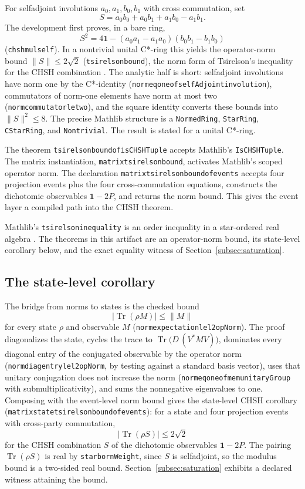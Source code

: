 \documentclass[11pt]{article}
\renewcommand{\_}{\textunderscore\allowbreak}
\theoremstyle{remark}
\newcommand{\Tr}{\operatorname{Tr}}
\newcommand{\one}{\mathbf 1}
\newcommand{\norm}[1]{\lVert #1\rVert}
\begin{document}
For selfadjoint involutions $a_0,a_1,b_0,b_1$ with cross commutation, set
\[
 S=a_0b_0+a_0b_1+a_1b_0-a_1b_1.
\]
The development first proves, in a bare ring,
\[
 S^2=4\one-(a_0a_1-a_1a_0)(b_0b_1-b_1b_0)
\]
(\texttt{chsh\_mul\_self}). In a nontrivial unital C*-ring this yields the
operator-norm bound $\norm{S}\le2\sqrt2$
(\texttt{tsirelson\_bound}), the norm form of Tsirelson's inequality
\cite{tsirelson1980} for the CHSH combination \cite{chsh1969}. The analytic
half is short: selfadjoint involutions have norm one by the C*-identity
(\texttt{norm\_eq\_one\_of\_selfAdjoint\_involution}), commutators of
norm-one elements have norm at most two
(\texttt{norm\_commutator\_le\_two}), and the square identity converts these
bounds into $\norm{S}^2\le8$. The precise Mathlib structure is a
\texttt{NormedRing}, \texttt{StarRing}, \texttt{CStarRing}, and
\texttt{Nontrivial}. The result is stated for a unital C*-ring.

The theorem \texttt{tsirelson\_bound\_of\_isCHSHTuple} accepts Mathlib's
\texttt{IsCHSHTuple}. The matrix instantiation,
\texttt{matrix\_tsirelson\_bound}, activates Mathlib's scoped operator
norm. The declaration \texttt{matrix\_tsirelson\_bound\_of\_events} accepts four
projection events plus the four cross-commutation equations, constructs the
dichotomic observables $\one-2P$, and returns the norm bound. This gives the
event layer a compiled path into the CHSH theorem.

Mathlib's \texttt{tsirelson\_inequality} is an order inequality in a
star-ordered real algebra \cite{mathlibCHSH2026}. The theorems in this
artifact are an operator-norm bound, its state-level corollary below, and
the exact equality witness of Section~\ref{subsec:saturation}.

\subsection{The state-level corollary}
\label{subsec:statechsh}

The bridge from norms to states is the checked bound
\[
 \lvert\Tr(\rho M)\rvert\le\norm{M}
\]
for every state $\rho$ and observable $M$
(\texttt{norm\_expectation\_le\_l2\_opNorm}). The proof diagonalizes the
state, cycles the trace to $\Tr\!\bigl(D\,(V^*MV)\bigr)$, dominates every
diagonal entry of the conjugated observable by the operator norm
(\texttt{norm\_diag\_entry\_le\_l2\_opNorm}, by testing against a standard
basis vector), uses that unitary conjugation does not increase the norm
(\texttt{norm\_eq\_one\_of\_mem\_unitaryGroup} with submultiplicativity), and
sums the nonnegative eigenvalues to one. Composing with the event-level norm
bound gives the state-level CHSH corollary
(\texttt{matrix\_state\_tsirelson\_bound\_of\_events}): for a state and four
projection events with cross-party commutation,
\[
 \bigl\lvert\Tr(\rho S)\bigr\rvert\le2\sqrt2
\]
for the CHSH combination $S$ of the dichotomic observables $\one-2P$. The
pairing $\Tr(\rho S)$ is real by \texttt{star\_bornWeight}, since $S$ is
selfadjoint, so the modulus bound is a two-sided real bound.
Section~\ref{subsec:saturation} exhibits a declared witness attaining the
bound.
\end{document}
